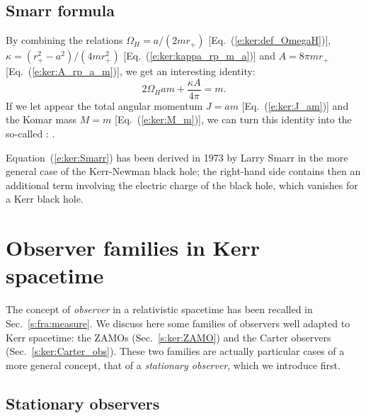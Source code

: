 \subsection{Smarr formula}

By combining the relations $\Omega_H = a/(2 m r_+)$ [Eq.~(\ref{e:ker:def_OmegaH})],
$\kappa = (r_+^2 - a^2)/(4 m r_+^2)$ [Eq.~(\ref{e:ker:kappa_rp_m_a})]
and $A = 8\pi m r_+$ [Eq.~(\ref{e:ker:A_rp_a_m})], we get an interesting
identity:
\[
    2 \Omega_H a m + \frac{\kappa A}{4\pi} = m .
\]
If we let appear the total angular momentum $J = a m$ [Eq.~(\ref{e:ker:J_am})]
and the Komar mass $M = m$ [Eq.~(\ref{e:ker:M_m})], we can turn this identity
into the so-called :
\be \label{e:ker:Smarr}
     .
\ee

\begin{hist}
Equation~(\ref{e:ker:Smarr}) has been derived in 1973 by Larry Smarr
\cite{Smarr73} in the more general case of the Kerr-Newman black hole;
the right-hand side contains then an additional term
involving the electric charge of the black hole, which vanishes for a Kerr black hole.
\end{hist}


\section{Observer families in Kerr spacetime} \label{s:ker:observers}

The concept of \emph{observer} in a relativistic spacetime
has been recalled in Sec.~\ref{s:fra:measure}.
We discuss here some families of observers well adapted to Kerr spacetime:
the ZAMOs (Sec.~\ref{s:ker:ZAMO}) and the Carter observers (Sec.~\ref{s:ker:Carter_obs}).
These two families are actually particular cases of a more general concept, that
of a \emph{stationary observer}, which we introduce first.

\subsection{Stationary observers} \label{s:ker:station_obs}

